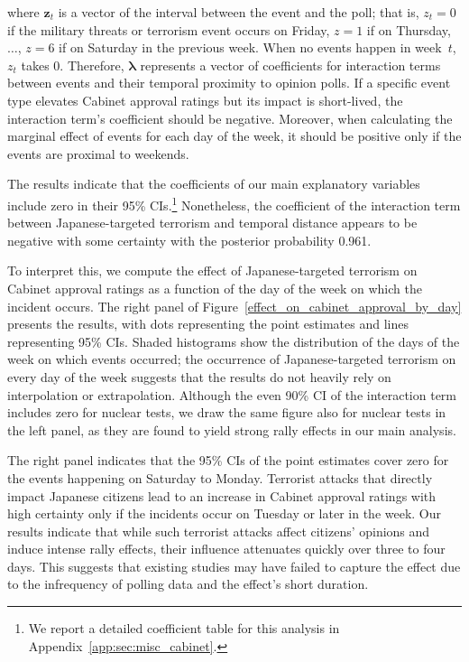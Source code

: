 \documentclass[letterpaper,12pt]{scrartcl}
\begin{document}
\noindent where $\bm{z}_{t}$ is a vector of the interval between the event and the poll; that is, $z_{t}=0$ if the military threats or terrorism event occurs on Friday, $z=1$ if on Thursday, $\ldots $, $z=6$ if on Saturday in the previous week. When no events happen in week~$t$, $z_{t}$ takes 0. Therefore, $\bm{\lambda}$  represents a vector of coefficients for interaction terms between events and their temporal proximity to opinion polls. If a specific event type elevates Cabinet approval ratings but its impact is short-lived, the interaction term's coefficient should be negative. Moreover, when calculating the marginal effect of events for each day of the week, it should be positive only if the events are proximal to weekends.

The results indicate that the coefficients of our main explanatory variables include zero in their 95\% CIs.\footnote{We report a detailed coefficient table for this analysis in Appendix~\ref{app:sec:misc_cabinet}.} Nonetheless, the coefficient of the interaction term between Japanese-targeted terrorism and temporal distance appears to be negative with some certainty with the posterior probability 0.961.

To interpret this, we compute the effect of Japanese-targeted terrorism on Cabinet approval ratings as a function of the day of the week on which the incident occurs. The right panel of Figure~\ref{effect_on_cabinet_approval_by_day} presents the results, with dots representing the point estimates and lines representing 95\% CIs. Shaded histograms show the distribution of the days of the week on which events occurred; the occurrence of Japanese-targeted terrorism on every day of the week suggests that the results do not heavily rely on interpolation or extrapolation. Although the even 90\% CI of the interaction term includes zero for nuclear tests, we draw the same figure also for nuclear tests in the left panel, as they are found to yield strong rally effects in our main analysis.

The right panel indicates that the 95\% CIs of the point estimates cover zero for the events happening on Saturday to Monday. Terrorist attacks that directly impact Japanese citizens lead to an increase in Cabinet approval ratings with high certainty only if the incidents occur on Tuesday or later in the week. Our results indicate that while such terrorist attacks affect citizens' opinions and induce intense rally effects, their influence attenuates quickly over three to four days. This suggests that existing studies may have failed to capture the effect due to the infrequency of polling data and the effect's short duration.
\end{document}
